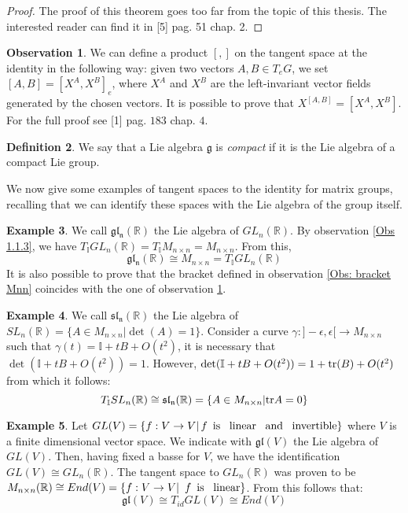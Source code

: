 \documentclass[12pt,a4paper]{report}
\theoremstyle{definition}
\newtheorem{Def}{Definition}[chapter]
\theoremstyle{Theorem}
\theoremstyle{definition}
\newtheorem{Ex}[Def]{Example}
\theoremstyle{definition}
\newtheorem{Obs}[Def]{Observation}
\begin{document}
	\begin{proof}
		The proof of this theorem goes too far from the topic of this thesis. The interested reader can find it in [5] pag. 51 chap. 2.
	\end{proof}
	\begin{Obs}\label{Obs: bracket T}
		We can define a product $[,]$ on the tangent space at the identity in the following way: given two vectors $A,B\in T_eG$, we set $[A,B]=[X^A,X^B]_e$, where $X^A$ and $X^B$ are the left-invariant vector fields generated by the chosen vectors. It is possible to prove that $X^{[A,B]}=[X^A,X^B]$. 
		For the full proof see [1] pag. $183$ chap. $4$.
	\end{Obs}
	\begin{Def}
		We say that a Lie algebra $\mathfrak{g}$ is \textit{compact} if it is the Lie algebra of a compact Lie group.
	\end{Def}
	We now give some examples of tangent spaces to the identity for matrix groups, recalling that we can identify these spaces with the Lie algebra of the group itself.
	\begin{Ex}
		We call $\mathfrak{gl_n(\mathbb{R})}$ the Lie algebra of $GL_n(\mathbb{R})$.
		By observation \ref{Obs 1.1.3}, we have $T_\mathbb{I}GL_n(\mathbb{R})=T_\mathbb{I}M_{n\times n}=M_{n\times n}$. From this, $$\mathfrak{gl_n(\mathbb{R})}\cong M_{n\times n}= T_\mathbb{I}GL_n(\mathbb{R})$$
		It is also possible to prove that the bracket defined in observation \ref{Obs: bracket Mnn} coincides with the one of observation \ref{Obs: bracket T}.
	\end{Ex}
	\begin{Ex}
		We call $\mathfrak{sl_n(\mathbb{R})}$ the Lie algebra of $SL_n(\mathbb{R})=\{A\in M_{n\times n}|\det(A)=1\}$.
		Consider a curve $\gamma:]-\epsilon,\epsilon[\rightarrow M_{n\times n}$ such that $\gamma(t)=\mathbb{I}+tB+O(t^2)$, it is necessary that $\det(\mathbb{I}+tB+O(t^2))=1$. However, $\det(\mathbb{I}+tB+O(t^2))=1+\hbox{tr}(B)+O(t^2)$ from which it follows: $$T_\mathbb{I}SL_n(\mathbb{R})\cong \mathfrak{sl_n(\mathbb{R})}=\{A\in M_{n\times n}|\hbox{tr}A=0\}$$ 
	\end{Ex}
	\begin{Ex}
		Let $GL(V)=\{f:V\rightarrow V|\, \textnormal{$f$\,  is \, linear \, and \, invertible}\}$ where $V$ is a finite dimensional vector space. We indicate with $\mathfrak{gl}(V)$ the Lie algebra of $GL(V)$.  Then, having fixed a basse for $V$, we have the identification $GL(V)\cong GL_n(\mathbb{R})$. The tangent space to $GL_n(\mathbb{R})$ was proven to be $M_{n\times n}(\mathbb{R})\cong End(V)=\{f:V\rightarrow V|\textnormal{\, $f$\, is \, linear}\}$. From this follows that: 
		$$\mathfrak{gl}(V)\cong T_{id}GL(V)\cong End(V)$$ 
	\end{Ex}
\end{document}
